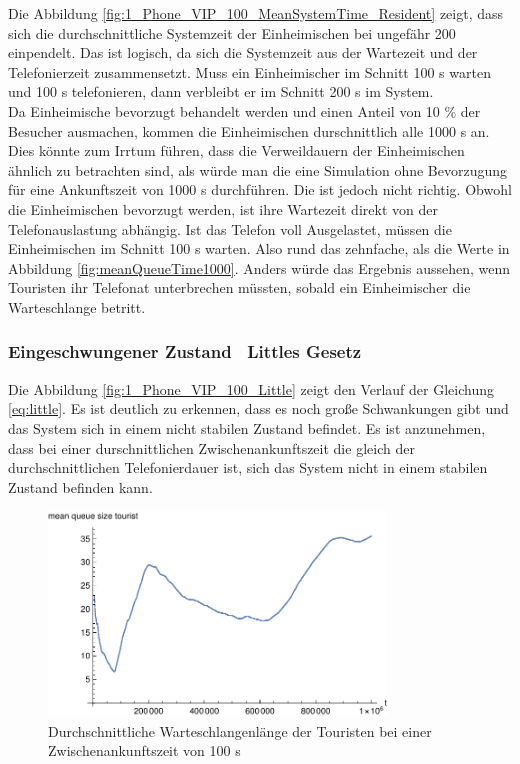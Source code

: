 Die Abbildung \ref{fig:1_Phone_VIP_100_MeanSystemTime_Resident} zeigt, dass sich die durchschnittliche Systemzeit der Einheimischen bei ungefähr 200 einpendelt. Das ist logisch, da sich die Systemzeit aus der Wartezeit und der Telefonierzeit zusammensetzt. Muss ein Einheimischer im Schnitt 100 s warten und 100 s telefonieren, dann verbleibt er im Schnitt 200 s im System.\\
Da Einheimische bevorzugt behandelt werden und einen Anteil von 10 \% der Besucher ausmachen, kommen die Einheimischen durschnittlich alle 1000 s an. Dies könnte zum Irrtum führen, dass die Verweildauern der Einheimischen ähnlich zu betrachten sind, als würde man die eine Simulation ohne Bevorzugung für eine Ankunftszeit von 1000 s durchführen. Die ist jedoch nicht richtig. Obwohl die Einheimischen bevorzugt werden, ist ihre Wartezeit direkt von der Telefonauslastung abhängig. Ist das Telefon voll Ausgelastet, müssen die Einheimischen im Schnitt 100 s warten. Also rund das zehnfache, als die Werte in Abbildung \ref{fig:meanQueueTime1000}. Anders würde das Ergebnis aussehen, wenn Touristen ihr Telefonat unterbrechen müssten, sobald ein Einheimischer die Warteschlange betritt. 
\subsubsection{Eingeschwungener Zustand \ Littles Gesetz}
Die Abbildung \ref{fig:1_Phone_VIP_100_Little} zeigt den Verlauf der Gleichung \ref{eq:little}. Es ist deutlich zu erkennen, dass es noch große Schwankungen gibt und das System sich in einem nicht stabilen Zustand befindet. Es ist anzunehmen, dass bei einer durschnittlichen Zwischenankunftszeit die gleich der durchschnittlichen Telefonierdauer ist, sich das System nicht in einem stabilen Zustand befinden kann.

\begin{figure}[htpb]
	\centering
	\includegraphics[width=0.8\textwidth]{abbildungen/1_Phone_VIP/Arrival_100_Serve_100_dur_1000000_Skip_0/MeanQueueSizeTourist.pdf}
	\caption{Durchschnittliche Warteschlangenlänge der Touristen bei einer Zwischenankunftszeit von 100 s}
	\label{fig:1_Phone_VIP_100_MeanQueueSize_Tourist}
\end{figure} 

